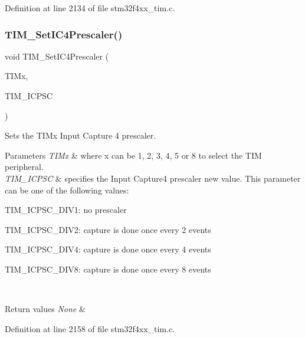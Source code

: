 Definition at line 2134 of file stm32f4xx\+\_\+tim.\+c.

\mbox{\label{group___t_i_m___group3_ga0f2c784271356d6b64b8c0da64dbdbc2}} 
\subsubsection{\texorpdfstring{T\+I\+M\+\_\+\+Set\+I\+C4\+Prescaler()}{TIM\_SetIC4Prescaler()}}
{\footnotesize\ttfamily void T\+I\+M\+\_\+\+Set\+I\+C4\+Prescaler (\begin{DoxyParamCaption}\item[{\hyperlink{struct_t_i_m___type_def}{T\+I\+M\+\_\+\+Type\+Def} $\ast$}]{T\+I\+Mx,  }\item[{uint16\+\_\+t}]{T\+I\+M\+\_\+\+I\+C\+P\+SC }\end{DoxyParamCaption})}



Sets the T\+I\+Mx Input Capture 4 prescaler. 


\begin{DoxyParams}{Parameters}
{\em T\+I\+Mx} & where x can be 1, 2, 3, 4, 5 or 8 to select the T\+IM peripheral. \\
\hline
{\em T\+I\+M\+\_\+\+I\+C\+P\+SC} & specifies the Input Capture4 prescaler new value. This parameter can be one of the following values\+: \begin{DoxyItemize}
\item T\+I\+M\+\_\+\+I\+C\+P\+S\+C\+\_\+\+D\+I\+V1\+: no prescaler \item T\+I\+M\+\_\+\+I\+C\+P\+S\+C\+\_\+\+D\+I\+V2\+: capture is done once every 2 events \item T\+I\+M\+\_\+\+I\+C\+P\+S\+C\+\_\+\+D\+I\+V4\+: capture is done once every 4 events \item T\+I\+M\+\_\+\+I\+C\+P\+S\+C\+\_\+\+D\+I\+V8\+: capture is done once every 8 events \end{DoxyItemize}
\\
\hline
\end{DoxyParams}

\begin{DoxyRetVals}{Return values}
{\em None} & \\
\hline
\end{DoxyRetVals}


Definition at line 2158 of file stm32f4xx\+\_\+tim.\+c.

